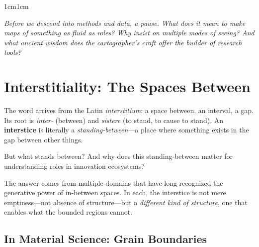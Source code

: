 \documentclass[../main.tex]{subfiles}
\begin{document}

\begin{center}
\end{center}

\vspace{1.5cm}

\begin{adjustwidth}{1cm}{1cm}

\noindent\textit{\large Before we descend into methods and data, a pause. What does it mean to make maps of something as fluid as roles? Why insist on multiple modes of seeing? And what ancient wisdom does the cartographer's craft offer the builder of research tools?}

\vspace{1.5cm}

\section*{Interstitiality: The Spaces Between}

The word arrives from the Latin \textit{interstitium}: a space between, an interval, a gap. Its root is \textit{inter-} (between) and \textit{sistere} (to stand, to cause to stand). An \textbf{interstice} is literally a \textit{standing-between}---a place where something exists in the gap between other things.

But what stands between? And why does this standing-between matter for understanding roles in innovation ecosystems?

The answer comes from multiple domains that have long recognized the generative power of in-between spaces. In each, the interstice is not mere emptiness---not absence of structure---but a \textit{different kind of structure}, one that enables what the bounded regions cannot.

\vspace{0.5cm}

\subsection*{In Material Science: Grain Boundaries}


\end{adjustwidth}
\end{document}
